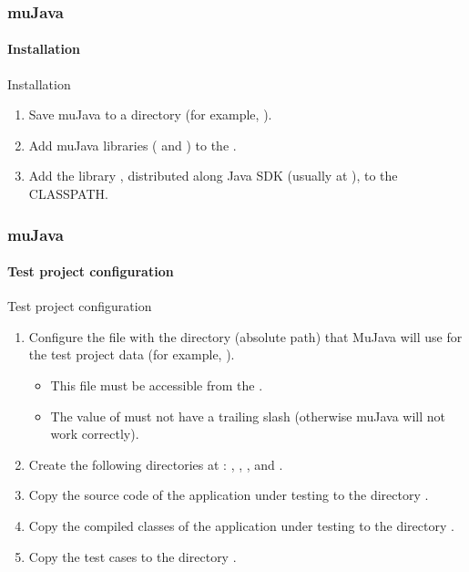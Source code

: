 \begin{frame}[parent={concept:mujava}, hasprev=false, hasnext=true]
\frametitle{muJava}
\framesubtitle{Installation}

\begin{block:procedure}{Installation}
\begin{enumerate}
	\item Save muJava to a directory (for example, ).

	\item Add muJava libraries ( and )
	to the .

	\item Add the library , distributed along Java SDK
	(usually at ), to the CLASSPATH.
\end{enumerate}
\end{block:procedure}
\end{frame}


\begin{frame}[hasprev=true, hasnext=true]
\frametitle{muJava}
\framesubtitle{Test project configuration}

\begin{block:procedure}{Test project configuration}
\begin{enumerate}
	\item Configure the file  with the directory
	(absolute path) that MuJava will use for the test project data (for
	example, ).
	\begin{itemize}
		\item This file must be accessible from the .

		\item The value of  must not have a trailing
		slash (otherwise muJava will not work correctly).
	\end{itemize}

	\item Create the following directories at :
	, , , and .

	\item Copy the source code of the application under testing to the
	directory .

	\item Copy the compiled classes of the application under testing to the
	directory .

	\item Copy the test cases to the directory .
\end{enumerate}
\end{block:procedure}
\end{frame}




